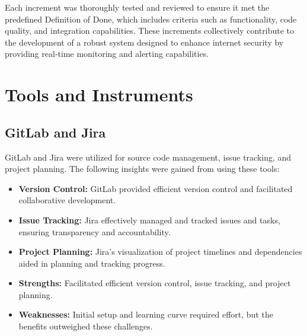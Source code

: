 \documentclass[11pt,a4paper]{article}
\begin{document}
    Each increment was thoroughly tested and reviewed to ensure it met the predefined Definition of Done, which includes criteria such as functionality, code quality, and integration capabilities. These increments collectively contribute to the development of a robust system designed to enhance internet security by providing real-time monitoring and alerting capabilities.

    \section{Tools and Instruments}\label{sec:tools-instruments}

    \subsection{GitLab and Jira}\label{subsec:gitlab-jira}
    GitLab and Jira were utilized for source code management, issue tracking, and project planning. The following insights were gained from using these tools:
    \begin{itemize}
        \item \textbf{Version Control:} GitLab provided efficient version control and facilitated collaborative development.
        \item \textbf{Issue Tracking:} Jira effectively managed and tracked issues and tasks, ensuring transparency and accountability.
        \item \textbf{Project Planning:} Jira's visualization of project timelines and dependencies aided in planning and tracking progress.
        \item \textbf{Strengths:} Facilitated efficient version control, issue tracking, and project planning.
        \item \textbf{Weaknesses:} Initial setup and learning curve required effort, but the benefits outweighed these challenges.
    \end{itemize}
\end{document}
